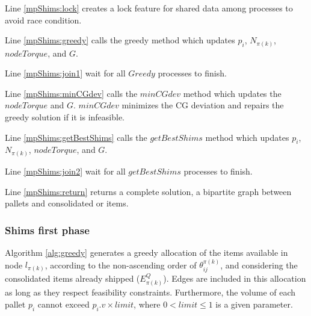 \documentclass[preprint,authoryear]{elsarticle}
\begin{document}
Line \ref{mpShims:lock} creates a lock feature for shared data among processes to avoid race condition.

Line \ref{mpShims:greedy} calls the greedy method which updates $p_i$, $N_{\pi(k)}$, $nodeTorque$, and $G$.

Line \ref{mpShims:join1} wait for all $Greedy$ processes to finish.

Line \ref{mpShims:minCGdev} calls the $minCGdev$ method which updates the $nodeTorque$ and $G$. $minCGdev$ minimizes the CG deviation and repairs the greedy solution if it is infeasible.

Line \ref{mpShims:getBestShims} calls the $getBestShims$ method which updates $p_i$, $N_{\pi(k)}$, $nodeTorque$, and $G$.

Line \ref{mpShims:join2} wait for all $getBestShims$ processes to finish.

Line \ref{mpShims:return} returns a complete solution, a bipartite graph between pallets and consolidated or items.

\subsubsection{Shims first phase}


Algorithm \ref{alg:greedy} generates a greedy allocation of the items available in node $l_{\pi(k)}$, according to the non-ascending order of $\theta^{\pi(k)}_{ij}$, and considering the consolidated items already shipped ($E^Q_{\pi(k)}$). Edges are included in this allocation as long as they respect feasibility constraints. Furthermore, the volume of each pallet $p_i$\/ cannot exceed $p_i.v \times limit$, where $ 0 < limit \leq 1$\/ is a given parameter.
\end{document}
